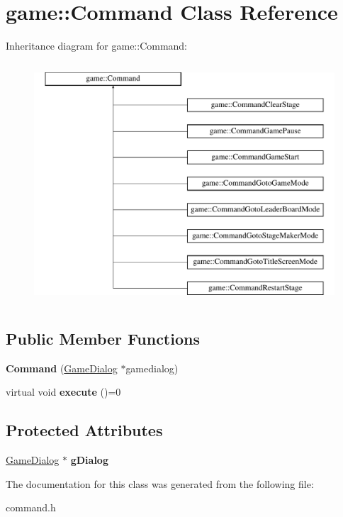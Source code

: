 \hypertarget{classgame_1_1Command}{}\section{game\+:\+:Command Class Reference}
\label{classgame_1_1Command}
Inheritance diagram for game\+:\+:Command\+:\begin{figure}[H]
\begin{center}
\leavevmode
\includegraphics[height=9.000000cm]{classgame_1_1Command}
\end{center}
\end{figure}
\subsection*{Public Member Functions}
\begin{DoxyCompactItemize}
\item 
\mbox{\label{classgame_1_1Command_aa2e0454851b0226dcd470f358c79206b}} 
{\bfseries Command} (\hyperlink{classgame_1_1GameDialog}{Game\+Dialog} $\ast$gamedialog)
\item 
\mbox{\label{classgame_1_1Command_a783331d21aa8d909c40ad4f75a228aad}} 
virtual void {\bfseries execute} ()=0
\end{DoxyCompactItemize}
\subsection*{Protected Attributes}
\begin{DoxyCompactItemize}
\item 
\mbox{\label{classgame_1_1Command_a0b597e617248e801486c7a614e5e7d1e}} 
\hyperlink{classgame_1_1GameDialog}{Game\+Dialog} $\ast$ {\bfseries g\+Dialog}
\end{DoxyCompactItemize}


The documentation for this class was generated from the following file\+:\begin{DoxyCompactItemize}
\item 
command.\+h\end{DoxyCompactItemize}
